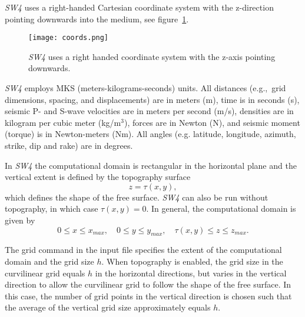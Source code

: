 \documentclass[11pt]{report}
\begin{document}
\emph{SW4} uses a right-handed Cartesian coordinate system with the z-direction pointing
downwards into the medium, see figure~\ref{fig:coordsys}. 
\begin{figure}[th]
\begin{centering}
 \texttt{[image: coords.png]}
  \caption{\emph{SW4} uses a right handed coordinate system with the z-axis pointing
  downwards.}
  \label{fig:coordsys}
\end{centering}
\end{figure}
\emph{SW4} employs MKS (meters-kilograms-seconds) units. All distances (e.g.,~grid dimensions,
spacing, and displacements) are in meters (m), time is in seconds (s), seismic P- and S-wave
velocities are in meters per second (m/s), densities are in kilogram per cubic meter (kg/m$^3$),
forces are in Newton (N), and seismic moment (torque) is in Newton-meters (Nm). All angles
(e.g. latitude, longitude, azimuth, strike, dip and rake) are in degrees. 

In \emph{SW4} the computational domain is rectangular in the horizontal plane and the vertical extent
is defined by the topography surface
\[
z=\tau(x,y),
\]
which defines the shape of the free surface. \emph{SW4} can also be run without
topography, in which case $\tau(x,y)=0$. In general, the computational domain is given by
\begin{equation}\label{eq:domain}
0\leq x\leq x_{max},\quad 0\leq y\leq y_{max},\quad \tau(x,y) \leq z \leq z_{max}.
\end{equation}

The grid command in the input file specifies the extent of the computational domain and the grid
size $h$. When topography is enabled, the grid size in the curvilinear grid equals $h$ in the
horizontal directions, but varies in the vertical direction to allow the curvilinear grid to follow
the shape of the free surface. In this case, the number of grid points in the vertical direction is
chosen such that the average of the vertical grid size approximately equals $h$.
\end{document}
